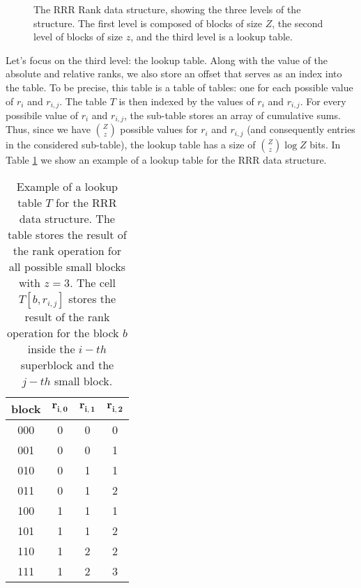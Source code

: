 \begin{figure}[h]
\begin{flushright}
    \end{flushright}
    \caption{The RRR Rank data structure, showing the three levels of the structure. The first level is composed of blocks of size $Z$, the second level of blocks of size $z$, and the third level is a lookup table.} \label{fig:RRR}
\end{figure}

\noindent Let's focus on the third level: the lookup table. Along with the value of the absolute and relative ranks, we also store an offset that serves as an index into the table. To be precise, this table is a table of tables: one for each possible value of $r_i$ and $r_{i,j}$. The table $T$ is then indexed by the values of $r_i$ and $r_{i,j}$. For every possibile value of $r_i$ and $r_{i,j}$, the sub-table stores an array of cumulative sums. Thus, since we have $\binom{Z}{z}$ possible values for $r_i$ and $r_{i,j}$ (and consequently entries in the considered sub-table), the lookup table has a size of $\binom{Z}{z}\log Z$ bits. In Table \ref{tab:lookup} we show an example of a lookup table for the RRR data structure. \vspace{0.4cm}

\begin{table}[h]
    \centering
    \begin{tabular}{|c|c|c|c|}
        \hline
        \textbf{block} & $\mathbf{r_{i,0}}$ & $\mathbf{r_{i,1}}$ & $\mathbf{r_{i,2}}$ \\
        \hline
        000            & 0                  & 0                  & 0                  \\
        001            & 0                  & 0                  & 1                  \\
        010            & 0                  & 1                  & 1                  \\
        011            & 0                  & 1                  & 2                  \\
        100            & 1                  & 1                  & 1                  \\
        101            & 1                  & 1                  & 2                  \\
        110            & 1                  & 2                  & 2                  \\
        111            & 1                  & 2                  & 3                  \\
        \hline
    \end{tabular}
    \caption{Example of a lookup table $T$ for the RRR data structure. The table stores the result of the rank operation for all possible small blocks with $z = 3$. The cell $T[b, r_{i,j}]$ stores the result of the rank operation for the block $b$ inside the $i-th$ superblock and the $j-th$ small block.} \label{tab:lookup}
\end{table}

